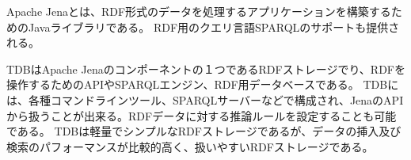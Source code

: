 Apache Jenaとは、RDF形式のデータを処理するアプリケーションを構築するためのJavaライブラリである。
RDF用のクエリ言語SPARQLのサポートも提供される。

TDBはApache Jenaのコンポーネントの１つであるRDFストレージでり、RDFを操作するためのAPIやSPARQLエンジン、RDF用データベースである。
TDBには、各種コマンドラインツール、SPARQLサーバーなどで構成され、JenaのAPIから扱うことが出来る。RDFデータに対する推論ルールを設定することも可能である。
TDBは軽量でシンプルなRDFストレージであるが、データの挿入及び検索のパフォーマンスが比較的高く、扱いやすいRDFストレージである。

